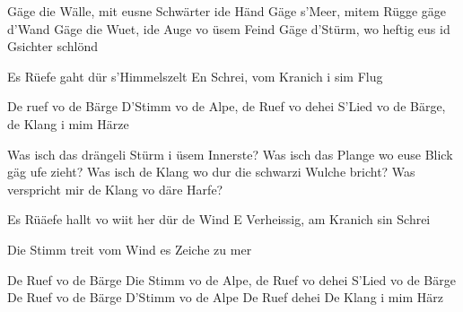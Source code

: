 \medskip

\begin{guitar}
  Gäge die Wälle, mit eusne Schwärter ide Händ
  Gäge s'Meer, mitem Rügge gäge d'Wand
  Gäge die Wuet, ide Auge vo üsem Feind
  Gäge d'Stürm, wo heftig eus id Gsichter schlönd

  Es Rüefe gaht dür s'Himmelszelt
  En Schrei, vom Kranich i sim Flug

  De ruef vo de Bärge
  D'Stimm vo de Alpe, de Ruef vo dehei
  S'Lied vo de Bärge, de Klang i mim Härze

  Was isch das drängeli Stürm i üsem Innerste?
  Was isch das Plange wo euse Blick gäg ufe zieht?
  Was isch de Klang wo dur die schwarzi Wulche bricht?
  Was verspricht mir de Klang vo däre Harfe?

  Es Rüäefe hallt vo wiit her dür de Wind
  E Verheissig, am Kranich sin Schrei

   

  Die Stimm treit vom Wind es Zeiche zu mer

  De Ruef vo de Bärge
  Die Stimm vo de Alpe, de Ruef vo dehei
  S'Lied vo de Bärge
  De Ruef vo de Bärge
  D'Stimm vo de Alpe
  De Ruef dehei
  De Klang i mim Härz
\end{guitar}
